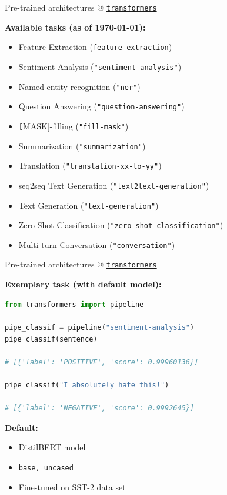 \documentclass[]{beamer}
\begin{document}
\begin{frame}[fragile]{Pre-trained architectures @ \href{https://github.com/huggingface/transformers}{\texttt{transformers}}}

\textbf{Available tasks (as of \today):}

\begin{itemize}
		\item Feature Extraction (\texttt{feature-extraction})
		\item Sentiment Analysis (\texttt{"sentiment-analysis"})
		\item Named entity recognition (\texttt{"ner"})
		\item Question Answering (\texttt{"question-answering"})
		\item \texttt[MASK]-filling (\texttt{"fill-mask"})
		\item Summarization (\texttt{"summarization"})
		\item Translation (\texttt{"translation-xx-to-yy"})
		\item seq2seq Text Generation (\texttt{"text2text-generation"})
		\item Text Generation (\texttt{"text-generation"})
		\item Zero-Shot Classification (\texttt{"zero-shot-classification"})
		\item Multi-turn Conversation (\texttt{"conversation"})
\end{itemize}
\end{frame}



\begin{frame}[fragile]{Pre-trained architectures @ \href{https://github.com/huggingface/transformers}{\texttt{transformers}}}

\textbf{Exemplary task (with default model):}
\vspace{-.2cm}
\begin{lstlisting}[language=Python]
from transformers import pipeline

pipe_classif = pipeline("sentiment-analysis")
pipe_classif(sentence)

# [{'label': 'POSITIVE', 'score': 0.99960136}]

pipe_classif("I absolutely hate this!")

# [{'label': 'NEGATIVE', 'score': 0.9992645}]
\end{lstlisting}

\vspace{.3cm}

\textbf{Default:}

\begin{itemize}
		\item DistilBERT model
		\item \texttt{base, uncased}
		\item Fine-tuned on SST-2 data set
\end{itemize}
\end{frame}
\end{document}
